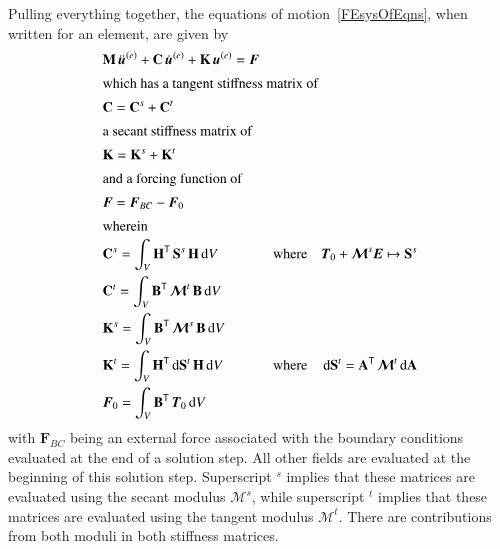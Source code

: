 Pulling everything together, the equations of motion~\eqref{FEsysOfEqns}, when written for an element, are given by
\begin{subequations}
    \label{EOM}
    \begin{align}
    \mbox{} & \mathbf{M} \, \ddot{\boldsymbol{u}}^{(e)} + 
    \mathbf{C} \, \dot{\boldsymbol{u}}^{(e)} + 
    \mathbf{K} \, \boldsymbol{u}^{(e)} = \boldsymbol{F} & & & \\
    \intertext{which has a tangent stiffness matrix of}
    \mbox{} & \mathbf{C} = \mathbf{C}^s + \mathbf{C}^t & & & \\
    \intertext{a secant stiffness matrix of}
    \mbox{} & \mathbf{K} = \mathbf{K}^s + \mathbf{K}^t & & & \\
    \intertext{and a forcing function of}    
    \mbox{} & \boldsymbol{F} = \boldsymbol{F}_{BC} - \boldsymbol{F}_0 & & & \\
    \intertext{wherein} 
    \mbox{} & \mathbf{C}^s = \int_V \mathbf{H}^{\mathsf{T}} \, 
        \mathbf{S}^s \, \mathbf{H} \, \mathrm{d}V
        & & \text{where} & \boldsymbol{T}_0 + 
        \boldsymbol{\mathcal{M}}^s \boldsymbol{E} \mapsto \mathbf{S}^s \\
    \mbox{} & \mathbf{C}^t = \int_V \mathbf{B}^{\mathsf{T}} \, 
        \boldsymbol{\mathcal{M}}^t \, \mathbf{B} \, \mathrm{d}V & & & \\
    \mbox{} & \mathbf{K}^s = \int_V \mathbf{B}^{\mathsf{T}} \, 
        \boldsymbol{\mathcal{M}}^s \, \mathbf{B} \, \mathrm{d}V & & & \\
    \mbox{} & \mathbf{K}^t = \int_V \mathbf{H}^{\mathsf{T}} \, 
        \mathrm{d}\mathbf{S}^t \, \mathbf{H} \, \mathrm{d}V 
        & & \text{where} &
        \mathrm{d}\mathbf{S}^t = \mathbf{A}^{\mathsf{T}} \, 
        \boldsymbol{\mathcal{M}}^t \, \mathrm{d} \mathbf{A} \\
    \mbox{} & \boldsymbol{F}_0 = \int_V \mathbf{B}^{\mathsf{T}} \, \boldsymbol{T}_0 \,
        \mathrm{d}V & & &
    \end{align} 
\end{subequations}
with $\boldsymbol{F}_{BC}$ being an external force associated with the boundary conditions evaluated at the end of a solution step.  All other fields are evaluated at the beginning of this solution step.  Superscript $\mbox{}^s$ implies that these matrices are evaluated using the secant modulus $\boldsymbol{\mathcal{M}}^s$, while superscript $\mbox{}^t$ implies that these matrices are evaluated using the tangent modulus $\boldsymbol{\mathcal{M}}^t$.  There are contributions from both moduli in both stiffness matrices.

